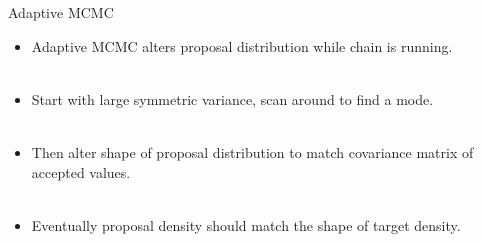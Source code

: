 \documentclass[compress]{beamer}
\begin{document}
\begin{frame}[label=sec-8-6]{Adaptive MCMC}
    \begin{itemize}
        \item \alert{Adaptive MCMC} alters proposal distribution while chain is running. \\~\\
        \item Start with large symmetric variance, scan around to find a mode. \\~\\
        \item Then alter shape of proposal distribution to match covariance matrix of accepted values.\\~\\
        \item Eventually proposal density should match the shape of target density.\\~\\
    \end{itemize}
\end{frame}
\end{document}
